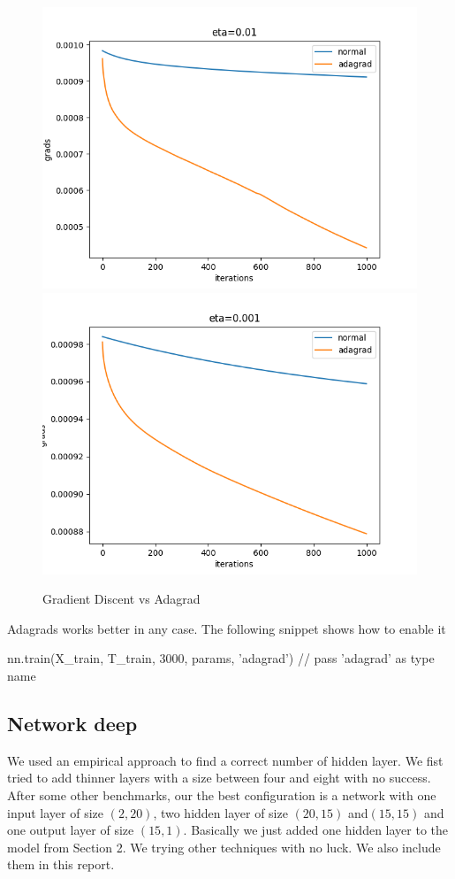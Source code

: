 \documentclass[11pt]{article}
\begin{document}
\begin{figure}[H]
\includegraphics[scale=0.5]{images/adagrad/adagrad_plot_2.png}	
\includegraphics[scale=0.5]{images/adagrad/adagrad_plot_3.png}	
\caption{Gradient Discent vs Adagrad}
\label{fig: adagrad}
\end{figure}
Adagrads works better in any case.
The following snippet shows how to enable it
\begin{python}
nn.train(X_train, T_train, 3000, params, 'adagrad') // pass 'adagrad' as type name
\end{python}

\subsection{Network deep}
We used an empirical approach to find a correct number of hidden layer. We fist tried to add thinner layers with a size between four and eight with no success. After some other benchmarks, our the best configuration is a network with one input layer of size $(2,20)$, two hidden layer of size $(20,15)$ and$(15,15)$ and one output layer of size $(15,1)$. Basically we just added one hidden layer to the model from Section 2.
We trying other techniques with no luck. We also include them in this report.
\end{document}
